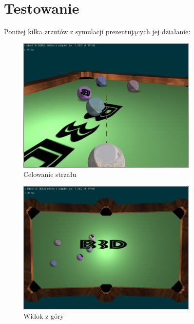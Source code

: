\section{Testowanie}

Poniżej kilka zrzutów z symulacji prezentujących jej działanie:

\begin{figure}[htp]
  \centering
  \includegraphics[width=0.8\textwidth]{./img/scr01.eps}
  \caption{Celowanie strzału}
  \label{fig:scr1}
\end{figure}

\begin{figure}[htp]
  \centering
  \includegraphics[width=0.8\textwidth]{./img/scr02.eps}
  \caption{Widok z góry}
  \label{fig:scr2}
\end{figure}

